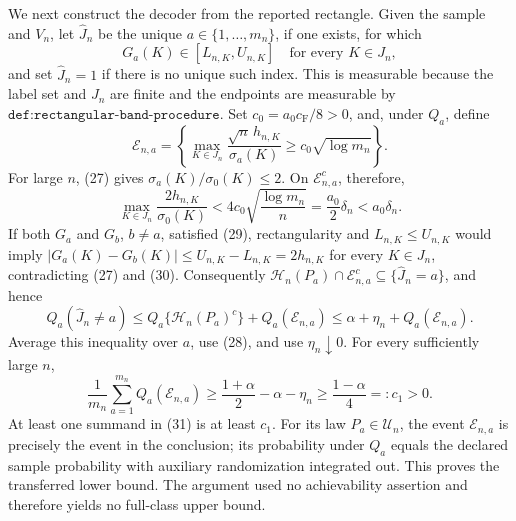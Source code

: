 We next construct the decoder from the reported rectangle.  Given the sample and \(V_n\), let \(\widehat J_n\) be the unique \(a\in\{1,\ldots,m_n\}\), if one exists, for which
\[
 G_a(K)\in[L_{n,K},U_{n,K}]\quad\text{for every }K\in J_n,  \tag{29}
\]
and set \(\widehat J_n=1\) if there is no unique such index.  This is measurable because the label set and \(J_n\) are finite and the endpoints are measurable by \(\texttt{def:rectangular-band-procedure}\).  Set \(c_0=a_0c_{\mathrm F}/8>0\), and, under \(Q_a\), define
\[
 \mathcal E_{n,a}=
 \left\{\max_{K\in J_n}
 \frac{\sqrt n\,h_{n,K}}{\sigma_a(K)}
 \geq c_0\sqrt{\log m_n}\right\}.
\]
For large \(n\), (27) gives \(\sigma_a(K)/\sigma_0(K)\leq2\).  On \(\mathcal E_{n,a}^{c}\), therefore,
\[
 \max_{K\in J_n}\frac{2h_{n,K}}{\sigma_0(K)}
 <4c_0\sqrt{\frac{\log m_n}{n}}
 =\frac{a_0}{2}\delta_n<a_0\delta_n.                         \tag{30}
\]
If both \(G_a\) and \(G_b\), \(b\neq a\), satisfied (29), rectangularity and \(L_{n,K}\leq U_{n,K}\) would imply \(|G_a(K)-G_b(K)|\leq U_{n,K}-L_{n,K}=2h_{n,K}\) for every \(K\in J_n\), contradicting (27) and (30).  Consequently \(\mathcal H_n(P_a)\cap\mathcal E_{n,a}^{c}\subseteq\{\widehat J_n=a\}\), and hence
\[
 Q_a(\widehat J_n\neq a)
 \leq Q_a\{\mathcal H_n(P_a)^c\}+Q_a(\mathcal E_{n,a})
 \leq\alpha+\eta_n+Q_a(\mathcal E_{n,a}).
\]
Average this inequality over \(a\), use (28), and use \(\eta_n\downarrow0\).  For every sufficiently large \(n\),
\[
 \frac1{m_n}\sum_{a=1}^{m_n}Q_a(\mathcal E_{n,a})
 \geq\frac{1+\alpha}{2}-\alpha-\eta_n
 \geq\frac{1-\alpha}{4}=:c_1>0.                              \tag{31}
\]
At least one summand in (31) is at least \(c_1\).  For its law \(P_a\in\mathcal U_n\), the event \(\mathcal E_{n,a}\) is precisely the event in the conclusion; its probability under \(Q_a\) equals the declared sample probability with auxiliary randomization integrated out.  This proves the transferred lower bound.  The argument used no achievability assertion and therefore yields no full-class upper bound.